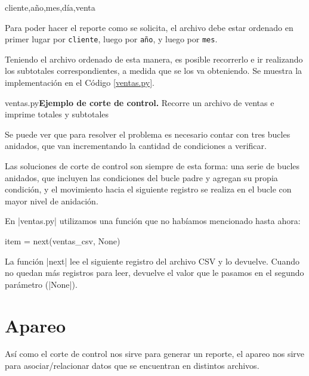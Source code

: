 \begin{codigo-nohl-sn}
cliente,año,mes,día,venta
\end{codigo-nohl-sn}

Para poder hacer el reporte como se solicita, el archivo debe estar ordenado en
primer lugar por \verb!cliente!, luego por \verb!año!, y luego por \verb!mes!.

Teniendo el archivo ordenado de esta manera, es posible recorrerlo e ir
realizando los subtotales correspondientes, a medida que se los va
obteniendo. Se muestra la implementación en el Código \ref{ventas.py}.

\begin{codigo}{ventas.py}{{\bf Ejemplo de corte de control.} Recorre un archivo
	de ventas e imprime totales y subtotales}
\label{ventas.py}

\end{codigo}

Se puede ver que para resolver el problema es necesario contar con tres
bucles anidados, que van incrementando la cantidad de condiciones a
verificar.

\begin{observacion}
Las soluciones de corte de control son siempre de esta forma: una serie de
bucles anidados, que incluyen las condiciones del bucle padre y agregan su
propia condición, y el movimiento hacia el siguiente registro se realiza en
el bucle con mayor nivel de anidación.
\end{observacion}

\begin{nota}
En |ventas.py| utilizamos una función que no habíamos mencionado hasta ahora:

\begin{codigo-nohl-sn}
item = next(ventas_csv, None)
\end{codigo-nohl-sn}

La función |next| lee el siguiente registro del archivo CSV y lo devuelve.
Cuando no quedan más registros para leer, devuelve el valor que le pasamos en
el segundo parámetro (|None|).
\end{nota}

\section{Apareo}

Así como el corte de control nos sirve para generar un reporte, el apareo nos
sirve para asociar/relacionar datos que se encuentran en distintos archivos.

